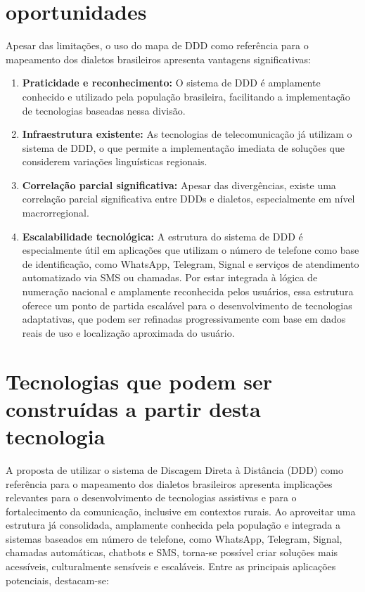 \section{oportunidades}
Apesar das limitações, o uso do mapa de DDD como referência para o mapeamento dos dialetos brasileiros apresenta vantagens significativas:
\begin{enumerate}
    \item \textbf{Praticidade e reconhecimento:} O sistema de DDD é amplamente conhecido e utilizado pela população brasileira, facilitando a implementação de tecnologias baseadas nessa divisão.
    \item \textbf{Infraestrutura existente:} As tecnologias de telecomunicação já utilizam o sistema de DDD, o que permite a implementação imediata de soluções que considerem variações linguísticas regionais.
    \item \textbf{Correlação parcial significativa:} Apesar das divergências, existe uma correlação parcial significativa entre DDDs e dialetos, especialmente em nível macrorregional.
    \item \textbf{Escalabilidade tecnológica:} A estrutura do sistema de DDD é especialmente útil em aplicações que utilizam o número de telefone como base de identificação, como WhatsApp, Telegram, Signal e serviços de atendimento automatizado via SMS ou chamadas. Por estar integrada à lógica de numeração nacional e amplamente reconhecida pelos usuários, essa estrutura oferece um ponto de partida escalável para o desenvolvimento de tecnologias adaptativas, que podem ser refinadas progressivamente com base em dados reais de uso e localização aproximada do usuário.

\end{enumerate}



\section{Tecnologias que podem ser construídas a partir desta tecnologia}

A proposta de utilizar o sistema de Discagem Direta à Distância (DDD) como referência para o mapeamento dos dialetos brasileiros apresenta implicações relevantes para o desenvolvimento de tecnologias assistivas e para o fortalecimento da comunicação, inclusive em contextos rurais. Ao aproveitar uma estrutura já consolidada, amplamente conhecida pela população e integrada a sistemas baseados em número de telefone, como WhatsApp, Telegram, Signal, chamadas automáticas, chatbots e SMS, torna-se possível criar soluções mais acessíveis, culturalmente sensíveis e escaláveis. Entre as principais aplicações potenciais, destacam-se:

